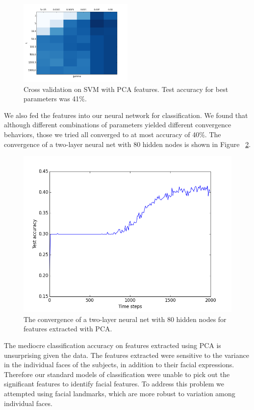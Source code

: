 \documentclass[10pt, twocolumn, twoside]{article}
\begin{document}
\begin{figure}[htb]
\centering
\includegraphics[width=0.5\textwidth]{grid_search_pca}
\caption{\label{fig:grid_pca} Cross validation on SVM with PCA features.
Test accuracy for best parameters was 41\%.}
\end{figure}

We also fed the features into our neural network for classification. We found that
although different combinations of parameters yielded different convergence behaviors,
those we tried all converged to at most accuracy of 40\%. The convergence of a
two-layer neural net with 80 hidden nodes is shown in Figure ~\ref{fig:pca_nnet}.

\begin{figure}[htb]
\centering
\includegraphics[width=\linewidth]{pca_nn_accuracy}
\caption{\label{fig:pca_nnet} The convergence of a two-layer neural net with 80
hidden nodes for features extracted with PCA.}
\end{figure}

The mediocre classification accuracy on features extracted using PCA is unsurprising
given the data. The features extracted were sensitive to the variance in the
individual faces of the subjects, in addition to their facial expressions. Therefore
our standard models of classification were unable to pick out the significant
features to identify facial features. To address this problem we attempted using
facial landmarks, which are more robust to variation among individual faces.
\end{document}
